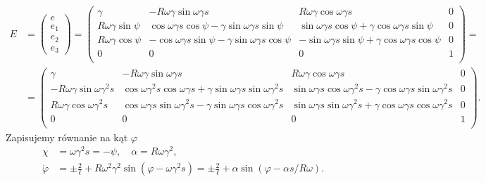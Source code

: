 \begin{align}\label{Esimple}
E&=
\begin{pmatrix}
e\\
e_1\\
e_2\\
e_3
\end{pmatrix}
=
\begin{pmatrix}
\gamma  & -R\omega\gamma \sin \omega \gamma s 
& R\omega\gamma \cos\omega\gamma s         & 0 \\
R\omega\gamma \sin \psi  
&  \cos\omega\gamma s \cos\psi 
-\gamma \sin \omega\gamma s \sin\psi &  
\sin\omega\gamma s \cos\psi
+\gamma \cos\omega\gamma s\sin \psi & 0 \\
R\omega\gamma \cos\psi      &  
-\cos\omega\gamma s \sin\psi 
- \gamma \sin\omega\gamma s \cos\psi   &  
-\sin\omega\gamma s \sin\psi 
+ \gamma \cos\omega\gamma s \cos\psi & 0 \\
0 & 0 & 0 & 1 \\
\end{pmatrix} 
=
\\
&=\nonumber
\begin{pmatrix} 
\gamma  & -R\omega\gamma \sin \omega \gamma s 
& R\omega\gamma \cos\omega\gamma s         & 0 \\
-R\omega\gamma \sin\omega\gamma^2 s  
&  \cos\omega\gamma^2 s\cos\omega\gamma s + 
\gamma \sin \omega\gamma s \sin\omega\gamma^2 s &  
\sin\omega\gamma s \cos\omega\gamma^2 s 
- \gamma \cos\omega\gamma s\sin \omega\gamma^2 s & 0 \\
R\omega\gamma \cos\omega\gamma^2 s       &  
\cos\omega\gamma s \sin\omega\gamma^2 s 
- \gamma \sin\omega\gamma s \cos\omega\gamma^2 s   &  
\sin\omega\gamma s \sin\omega\gamma^2 s 
+ \gamma \cos\omega\gamma s \cos\omega\gamma^2 s & 0 \\
0 & 0 & 0 & 1 \\
\end{pmatrix}.
\end{align}
Zapisujemy równanie na kąt $\varphi$
\begin{align*}\nonumber
\chi &= \omega \gamma^2 s = - \psi, \quad \alpha = R \omega \gamma^2, \\
\dot{\varphi} &= \pm \frac{2}{\ell} + \label{phiSimple}
R \omega^2 \gamma^2\sin (\varphi - \omega\gamma^2 s )
= \pm \frac{2}{\ell} +\alpha \sin (\varphi - \alpha s / R\omega ) .
\end{align*}

